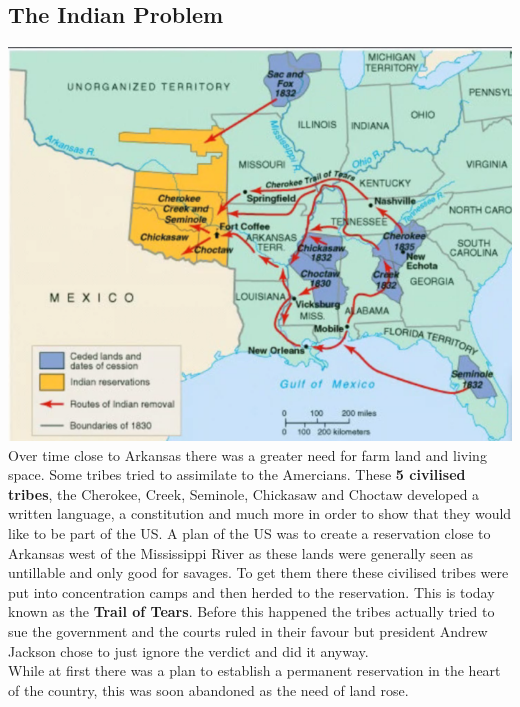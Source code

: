 \documentclass{article}
\begin{document}
	\subsection{The Indian Problem}
	\includegraphics{Trail_of_Tears.png} \\
	Over time close to Arkansas there was a greater need for farm land and living space. Some tribes tried to assimilate to the Amercians. These \textbf{5 civilised tribes}, the Cherokee, Creek, Seminole, Chickasaw and Choctaw developed a written language, a constitution and much more in order to show that they would like to be part of the US. A plan of the US was to create a reservation close to Arkansas west of the Mississippi River as these lands were generally seen as untillable and only good for savages. To get them there these civilised tribes were put into concentration camps and then herded to the reservation. This is today known as the \textbf{Trail of Tears}. Before this happened the tribes actually tried to sue the government and the courts ruled in their favour but president Andrew Jackson chose to just ignore the verdict and did it anyway. \\
	While at first there was a plan to establish a permanent reservation in the heart of the country, this was soon abandoned as the need of land rose. \\
\end{document}
